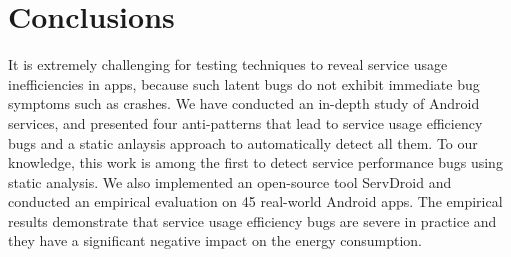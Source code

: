 \documentclass[conference]{IEEEtran}
\begin{document}
\section{Conclusions}\label{conclusion}
It is extremely challenging for testing techniques to reveal service usage
inefficiencies in apps, because such latent bugs do not exhibit
immediate bug symptoms such as crashes.
We have conducted an in-depth study of Android services, and presented four
anti-patterns that lead to service usage efficiency bugs and a static
anlaysis approach to automatically detect all them. To our knowledge,
this work is among the first to detect service performance bugs using static
analysis. We also implemented an open-source tool {\sf ServDroid} and conducted
an empirical evaluation on 45 real-world Android apps. The empirical results
demonstrate that service usage efficiency bugs are severe in practice and they
have a significant negative impact on the energy consumption.






\end{document}
